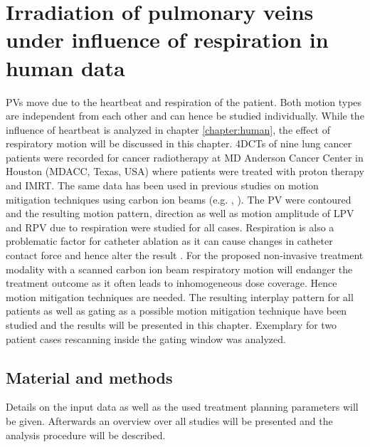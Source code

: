 \documentclass[type=dr, dr=rernat, accentcolor=tud7b,colorbacktitle, bigchapter, openright, twoside, 12pt ]{tudthesis}
\begin{document}
\dominitoc
\setcounter{tocdepth}{1}
\tableofcontents
\chapter{Irradiation of pulmonary veins under influence of respiration in human data}
\label{chapter:mdacc}
\minitoc

PVs move due to the heartbeat and respiration of the patient. Both motion types are independent from each other and can hence be studied 
individually. While the influence of heartbeat is analyzed in chapter \ref{chapter:human}, the effect of respiratory motion will be discussed 
in this chapter. 4DCTs of nine lung cancer patients were recorded for cancer radiotherapy at MD Anderson Cancer Center in Houston (MDACC, 
Texas, USA) where patients were treated with proton therapy and IMRT. The same data has been used in previous studies on motion mitigation 
techniques using carbon ion beams (e.g. \cite{Lue12}, \cite{Woe11}). The PV were contoured and the resulting motion pattern, direction as well as 
motion amplitude of LPV and RPV due to respiration were studied for all cases. Respiration is also a problematic factor for catheter ablation 
as it can cause changes in catheter contact force and hence alter the result \cite{Kum12}. For the proposed non-invasive treatment modality 
with a scanned carbon ion beam respiratory motion will endanger the treatment outcome as it often leads to inhomogeneous dose coverage. Hence 
motion mitigation techniques are needed. The resulting interplay pattern for all patients as well as gating as a possible motion mitigation 
technique have been studied and the results will be presented in this chapter. Exemplary for two patient cases rescanning inside the gating 
window was analyzed. 

\section{Material and methods}
Details on the input data as well as the used treatment planning parameters will be given. Afterwards an overview over all 
studies will be presented and the analysis procedure will be described.  
\end{document}

